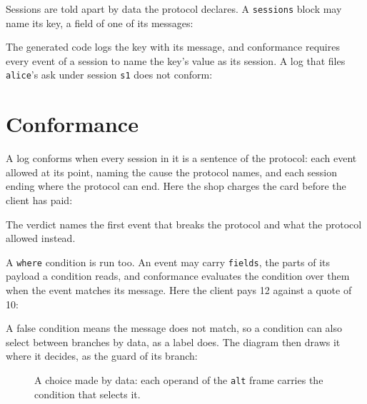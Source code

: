 Sessions are told apart by data the protocol declares. A \texttt{sessions} block
may name its key, a field of one of its messages:



The generated code logs the key with its message, and conformance requires every
event of a session to name the key's value as its session. A log that files
\texttt{alice}'s ask under session \texttt{s1} does not conform:





\section{Conformance}

A log conforms when every session in it is a sentence of the protocol: each event
allowed at its point, naming the cause the protocol names, and each session ending
where the protocol can end. Here the shop charges the card before the client has
paid:





The verdict names the first event that breaks the protocol and what the protocol
allowed instead.

A \texttt{where} condition is run too. An event may carry \texttt{fields}, the
parts of its payload a condition reads, and conformance evaluates the condition
over them when the event matches its message. Here the client pays 12 against a
quote of 10:





A false condition means the message does not match, so a condition can also select
between branches by data, as a label does. The diagram then draws it where it
decides, as the guard of its branch:



\begin{figure}[htbp]
\centering
{}
\caption{A choice made by data: each operand of the \texttt{alt} frame carries the
condition that selects it.}
\label{fig:tier}
\end{figure}

